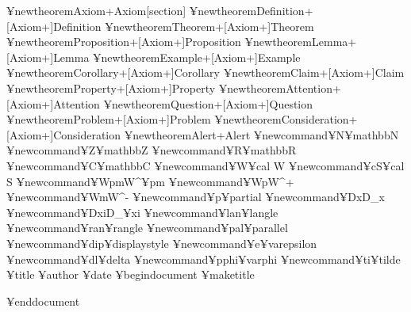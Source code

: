     ¥newtheorem{Axiom+}{Axiom}[section]
    ¥newtheorem{Definition+}[Axiom+]{Definition}
    ¥newtheorem{Theorem+}[Axiom+]{Theorem}
    ¥newtheorem{Proposition+}[Axiom+]{Proposition}
    ¥newtheorem{Lemma+}[Axiom+]{Lemma}
    ¥newtheorem{Example+}[Axiom+]{Example}
    ¥newtheorem{Corollary+}[Axiom+]{Corollary}
    ¥newtheorem{Claim+}[Axiom+]{Claim}
    ¥newtheorem{Property+}[Axiom+]{Property}
    ¥newtheorem{Attention+}[Axiom+]{Attention}
    ¥newtheorem{Question+}[Axiom+]{Question}
    ¥newtheorem{Problem+}[Axiom+]{Problem}
    ¥newtheorem{Consideration+}[Axiom+]{Consideration}
    ¥newtheorem{Alert+}{Alert}
    ¥newcommand{¥N}{¥mathbb{N}}
¥newcommand{¥Z}{¥mathbb{Z}}
¥newcommand{¥R}{¥mathbb{R}}
¥newcommand{¥C}{¥mathbb{C}}
¥newcommand{¥W}{{¥cal W}}
¥newcommand{¥cS}{{¥cal S}}
¥newcommand{¥Wpm}{W^{¥pm}}
¥newcommand{¥Wp}{W^{+}}
¥newcommand{¥Wm}{W^{-}}
¥newcommand{¥p}{¥partial}
¥newcommand{¥Dx}{D_{x}}
¥newcommand{¥Dxi}{D_{¥xi}}
¥newcommand{¥lan}{¥langle}
¥newcommand{¥ran}{¥rangle}
¥newcommand{¥pal}{¥parallel}
¥newcommand{¥dip}{¥displaystyle }
¥newcommand{¥e}{¥varepsilon}
¥newcommand{¥dl}{¥delta}
¥newcommand{¥pphi}{¥varphi}
¥newcommand{¥ti}{¥tilde}
    ¥title{}
    ¥author{}
    ¥date{}
¥begin{document}
¥maketitle

¥end{document}
